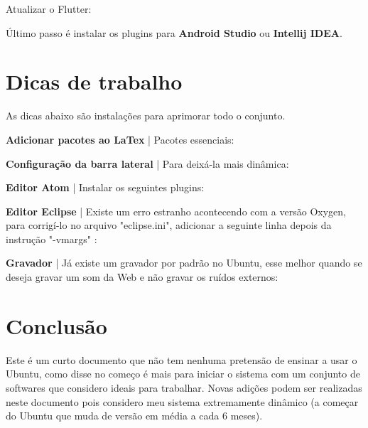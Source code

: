 \documentclass[a4paper,11pt]{article}
\begin{document}
Atualizar o Flutter: \\

Último passo é instalar os plugins para \textbf{Android Studio} ou \textbf{Intellij IDEA}.

\section{Dicas de trabalho}
As dicas abaixo são instalações para aprimorar todo o conjunto.

\textbf{Adicionar pacotes ao LaTex} | Pacotes essenciais: \\

\textbf{Configuração da barra lateral} | Para deixá-la mais dinâmica: \\

\textbf{Editor Atom} | Instalar os seguintes plugins: \\

\textbf{Editor Eclipse} | Existe um erro estranho acontecendo com a versão Oxygen, para corrigí-lo no arquivo "eclipse.ini", adicionar a seguinte linha depois da instrução "-vmargs" : \\

\textbf{Gravador} | Já existe um gravador por padrão no Ubuntu, esse melhor quando se deseja gravar um som da Web e não gravar os ruídos externos: \\

\section{Conclusão}
Este é um curto documento que não tem nenhuma pretensão de ensinar a usar o Ubuntu, como disse no começo é mais para iniciar o sistema com um conjunto de softwares que considero ideais para trabalhar. Novas adições podem ser realizadas neste documento pois considero meu sistema extremamente dinâmico (a começar do Ubuntu que muda de versão em média a cada 6 meses). 
\end{document}
